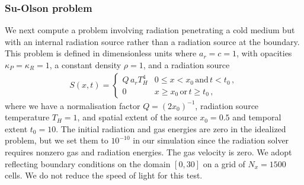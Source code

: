 \documentclass[fleqn,usenatbib]{mnras}
\begin{document}
\subsubsection{Su-Olson problem}
\label{ssec:suolson}
We next compute a problem involving radiation penetrating a cold medium but with an internal radiation source rather than a radiation source at the boundary. This problem is defined in dimensionless units where $a_r = c = 1$, with opacities $\kappa_P = \kappa_R = 1$, a constant density $\rho = 1$, and a radiation source
\begin{align}
S(x,t) =
\begin{cases}
    Q \, a_r T_H^4 & 0 \leq x < x_0 \, \text{and} \, t < t_0 \, , \\
    0 & x \geq x_0 \, \text{or} \, t \geq t_0 \, ,
\end{cases}
\end{align}
where we have a normalisation factor $Q = (2 x_0)^{-1}$, radiation source temperature $T_H = 1$, and spatial extent of the source $x_0 = 0.5$ and temporal extent $t_0 = 10$. The initial radiation and gas energies are zero in the idealized problem, but we set them to $10^{-10}$ in our simulation since the radiation solver requires nonzero gas and radiation energies. The gas velocity is zero. We adopt reflecting boundary conditions on the domain $[0, 30]$ on a grid of $N_x = 1500$ cells. We do not reduce the speed of light for this test.
\end{document}
